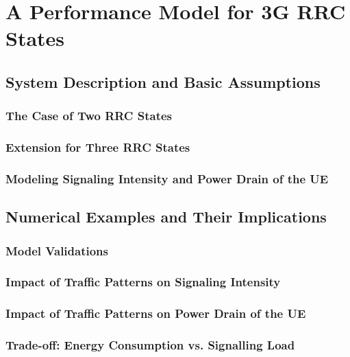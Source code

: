 \section{A Performance Model for \acrshort{3G} \acrshort{RRC} States}\label{sec:network:performance_model}
\cite{Schwartz2013c}

\subsection{System Description and Basic Assumptions}\label{sec:network:performance_model:system_description}

\subsubsection*{The Case of Two \acrshort{RRC} States}\label{sec:network:performance_model:system_description:two_states}
\subsubsection*{Extension for Three \acrshort{RRC} States}\label{sec:network:performance_model:system_description:three_states}
\subsubsection*{Modeling Signaling Intensity and Power Drain of the \acrshort{UE}}\label{sec:network:performance_model:system_description:metrics}

\subsection{Numerical Examples and Their Implications}\label{sec:network:performance_model:numerical_examples}
\subsubsection*{Model Validations}\label{sec:network:performance_model:validations}
\subsubsection*{Impact of Traffic Patterns on Signaling Intensity}\label{sec:network:performance_model:signaling_intensity}
\subsubsection*{Impact of Traffic Patterns on Power Drain of the \acrshort{UE}}\label{sec:network:performance_model:power_drain}
\subsubsection*{Trade-off: Energy Consumption vs. Signalling Load}\label{sec:network:performance_model:trade_off}
